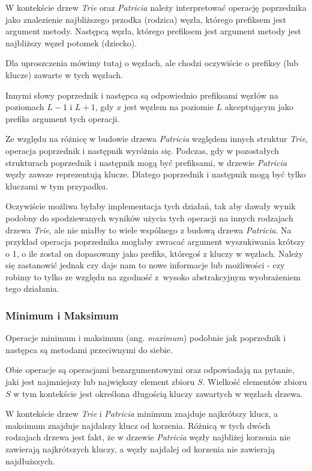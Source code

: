 		W kontekście drzew \emph{Trie} oraz \emph{Patricia} należy interpretować operację poprzednika jako znalezienie najbliższego przodka (rodzica) węzła, którego prefiksem jest argument metody. Następcą węzła, którego prefiksem jest argument metody jest najbliższy węzeł potomek (dziecko).
		
		Dla uproszczenia mówimy tutaj o węzłach, ale chodzi oczywiście o prefiksy (lub klucze) zawarte w tych węzłach.
		
		Innymi słowy poprzednik i następca są odpowiednio prefiksami węzłów na poziomach $L-1$ i $L+1$, gdy $x$ jest węzłem na poziomie $L$ akceptującym jako prefiks argument tych operacji.
		
		Ze względu na różnicę w budowie drzewa \emph{Patricia} względem innych struktur \emph{Trie}, operacja poprzednik i następnik wyróżnia się. Podczas, gdy w pozostałych strukturach poprzednik i następnik mogą być prefiksami, w drzewie \emph{Patricia} węzły zawsze reprezentują klucze. Dlatego poprzednik i następnik mogą być tylko kluczami w tym przypadku. 
		
		Oczywiście możliwa byłaby implementacja tych działań, tak aby dawały wynik podobny do spodziewanych wyników użycia tych operacji na innych rodzajach drzewa \emph{Trie}, ale nie miałby to wiele wspólnego z budową drzewa \emph{Patricia}. Na przykład operacja poprzednika mogłaby zwracać argument wyszukiwania krótszy o 1, o ile został on dopasowany jako prefiks, któregoś z kluczy w węzłach. Należy się zastanowić jednak czy daje nam to nowe informacje lub możliwości - czy robimy to tylko ze względu na zgodność z~wysoko abstrakcyjnym wyobrażeniem tego działania.
		
		\subsubsection{Minimum i Maksimum}\label{sec:czescTeoretycznaPrzegladDrzewTrieOperacjeMinimumIMaximum}
		
		Operacje minimum i maksimum (ang. \emph{maximum}) podobnie jak poprzednik i następca są metodami przeciwnymi do siebie. 
		
        Obie operacje są operacjami bezargumentowymi oraz odpowiadają na pytanie, jaki jest najmniejszy lub największy element zbioru $S$. Wielkość elementów zbioru $S$ w tym kontekście jest określona długością kluczy zawartych w węzłach drzewa. 
		
        W kontekście drzew \emph{Trie} i \emph{Patricia} minimum znajduje najkrótszy klucz, a maksimum znajduje najdalszy klucz od korzenia. Różnicą w tych dwóch rodzajach drzewa jest fakt, że w drzewie \emph{Patricia} węzły najbliżej korzenia nie zawierają najkrótszych kluczy, a węzły najdalej od korzenia nie zawierają najdłuższych.
        
